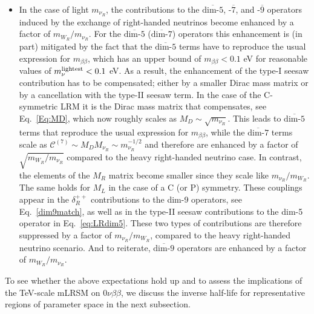 \documentclass[letterpaper,11pt]{article}
\newcommand{\bt}{\beta}
\newcommand{\dt}{\delta}
\newcommand{\textoverline}[1]{$\overline{\mbox{#1}}$}
\begin{document}
\begin{itemize}
\item
In the case of light $m_{\nu_R}$, the contributions to the \textoverline{dim-5}, -\textoverline{7}, and -\textoverline{9} operators induced by the exchange of right-handed neutrinos become enhanced by a factor of $m_{W_R}/m_{\nu_R}$. 
For the \textoverline{dim-5}  (\textoverline{dim-7}) operators this enhancement is (in part) mitigated by the fact that the \textoverline{dim-5} terms have to reproduce the usual expression for $m_{\bt\bt}$, which has an upper bound of $m_{\bt\bt}<0.1$ eV for reasonable values of $m_\nu^{\rm lightest}<0.1$ eV. As a result, the enhancement of the type-I seesaw contribution has to be compensated; either by a smaller Dirac mass matrix or by a cancellation with the type-II seesaw term. In the case of the C-symmetric LRM it is the Dirac mass matrix that compensates, see Eq.\ \eqref{Eq:MD},  which now roughly scales as $M_D\sim \sqrt{m_{\nu_R}}$. This leads to \textoverline{dim-5} terms that reproduce the usual expression for $m_{\bt\bt}$, while the \textoverline{dim-7} terms scale as $\mathcal C^{(7)}\sim M_D M_{\nu_R}\sim m_{\nu_R}^{-1/2}$ and therefore are enhanced by a factor of $\sqrt{m_{W_R}/m_{\nu_R}}$ compared to the heavy right-handed neutrino case.
In contrast, the elements of the $M_R$ matrix become smaller since they scale like  $m_{\nu_R}/m_{W_R}$. The same holds for $M_L$ in the case of a C (or P) symmetry. These couplings appear in the $\dt^{++}_R$ contributions to the dim-9 operators, see Eq.\ \eqref{dim9match}, as well as in the type-II seesaw contributions to the dim-5 operator in Eq.\ \eqref{eq:LRdim5}. These two types of contributions are therefore suppressed by a factor of $m_{\nu_R}/m_{W_R}$, compared to the heavy right-handed neutrino scenario. And to reiterate, \textoverline{dim-9} operators 
are enhanced by a factor of $m_{W_R}/m_{\nu_R}$.

\end{itemize}

To see whether the above expectations hold up and to assess the implications  of the TeV-scale mLRSM on $0\nu\bt\bt$, 
we discuss the inverse half-life for representative regions of parameter space in the next subsection.
\end{document}
